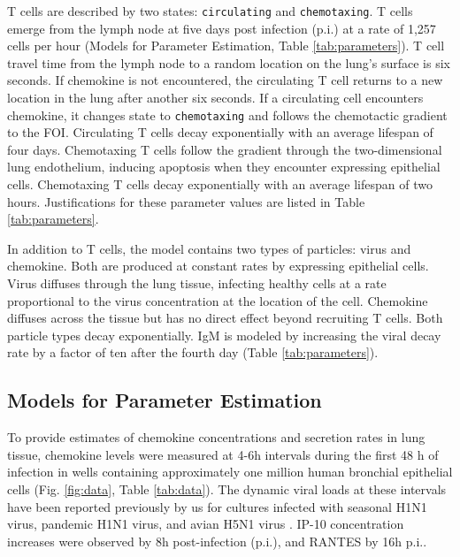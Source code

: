 \documentclass[preprint,10pt,numbers]{elsarticle}
\begin{document}
T cells are described by two states: \texttt{circulating} and \texttt{chemotaxing}.    T cells emerge from the lymph node at five days post infection (p.i.) at a rate of 1,257 cells per hour (Models for Parameter Estimation, Table \ref{tab:parameters}). T cell travel time from the lymph node to a random location on the lung's surface is six seconds.  If chemokine is not encountered, the circulating T cell returns to a new location in the lung after another six seconds.  If a circulating cell encounters chemokine, it changes state to \texttt{chemotaxing} and follows the chemotactic gradient to the FOI. Circulating T cells decay exponentially with an average lifespan of four days.  Chemotaxing T cells follow the gradient through the two-dimensional lung endothelium, inducing apoptosis when they encounter expressing epithelial cells. Chemotaxing T cells decay exponentially with an average lifespan of two hours.  Justifications for these parameter values are listed in Table \ref{tab:parameters}.

In addition to T cells, the model contains two types of particles: virus and chemokine. Both are produced at constant rates by expressing epithelial cells.  Virus diffuses through the lung tissue, infecting healthy cells at a rate proportional to the virus concentration at the location of the cell. Chemokine diffuses across the tissue but has no direct effect beyond recruiting T cells. Both particle types decay exponentially.  IgM is modeled by increasing the viral decay rate by a factor of ten after the fourth day (Table \ref{tab:parameters}).

\subsection*{Models for Parameter Estimation}

To provide estimates of chemokine concentrations and secretion rates in lung tissue, chemokine levels were measured at 4-6h intervals during the first 48 h of infection in wells containing approximately one million human bronchial epithelial cells (Fig. \ref{fig:data}, Table \ref{tab:data}).  The dynamic viral loads at these intervals have been reported previously by us for cultures infected with seasonal H1N1 virus, pandemic H1N1 virus, and avian H5N1 virus \citep{Mitchell2011}.  IP-10 concentration increases were observed by 8h post-infection (p.i.), and RANTES by 16h p.i..
\end{document}
